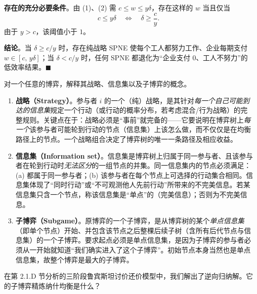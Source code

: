 \textbf{存在的充分必要条件}。由 (1)、(2) 需 $c\le w\le y\delta$，存在这样的 $w$ 当且仅当
\[
\boxed{c\le y\delta\quad\Longleftrightarrow\quad \delta\ge \frac{c}{y}}.
\]\indent
由于 $y>c$，该阈值小于 $1$。

\textbf{结论}。当 $\delta\ge c/y$ 时，存在纯战略 SPNE 使每个工人都努力工作、企业每期支付 $w\in[c,\,y\delta]$；当 $\delta<c/y$ 时，任何 SPNE 都退化为“企业支付 $0$、工人不努力”的低效率结果。$\blacksquare$

对一个任意的博弈，解释其战略、信息集以及子博弈的概念。

\sol
\begin{enumerate}[leftmargin=*,label=(\roman*)]
  \item \textbf{战略（Strategy）}。参与者 $i$ 的一个（纯）战略，是其针对\textit{每一个自己可能到达的信息集}规定一个行动（或行动的概率分布，若考虑混合/行为战略）的完整规则。关键点在于：战略必须是“事前”就完备的——它要说明在博弈树上\textit{每一个}该参与者可能轮到行动的节点（信息集）上该怎么做，而不仅仅是在均衡路径上的节点。一个战略组合决定了博弈树的唯一一条路径及相应收益。
  \item \textbf{信息集（Information set）}。信息集是博弈树上归属于同一参与者、且该参与者在轮到行动时\textit{无法区分}的一组节点的并集。同一信息集内的节点必须满足：(a) 都属于同一参与者；(b) 该参与者在每个节点上可选择的行动集合相同。信息集体现了“同时行动”或“不可观测他人先前行动”所带来的不完美信息。若某信息集只含一个节点，称该信息集是“单点”的（完美信息）；否则为不完美信息。
  \item \textbf{子博弈（Subgame）}。原博弈的一个子博弈，是从博弈树的某个\textit{单点信息集}（即单个节点）开始、并包含该节点之后整棵后续子树（含所有后代节点与信息集）的一个子博弈。要求起点必须是单点信息集，是因为子博弈的参与者必须从一开始就知道“我们确实进入了这个子博弈”。初始节点本身当然也是单点信息集，故整个博弈是最大的子博弈。
\end{enumerate}


在第 2.1.D 节分析的三阶段鲁宾斯坦讨价还价模型中，我们解出了逆向归纳解。它的子博弈精炼纳什均衡是什么？


